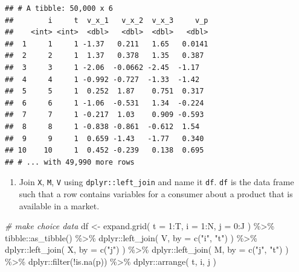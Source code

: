 \documentclass[
]{book}
\newenvironment{Shaded}{\begin{snugshade}}{\end{snugshade}}
\newcommand{\AttributeTok}[1]{\textcolor[rgb]{0.77,0.63,0.00}{#1}}
\newcommand{\CommentTok}[1]{\textcolor[rgb]{0.56,0.35,0.01}{\textit{#1}}}
\newcommand{\DecValTok}[1]{\textcolor[rgb]{0.00,0.00,0.81}{#1}}
\newcommand{\FunctionTok}[1]{\textcolor[rgb]{0.00,0.00,0.00}{#1}}
\newcommand{\NormalTok}[1]{#1}
\newcommand{\OtherTok}[1]{\textcolor[rgb]{0.56,0.35,0.01}{#1}}
\newcommand{\SpecialCharTok}[1]{\textcolor[rgb]{0.00,0.00,0.00}{#1}}
\newcommand{\StringTok}[1]{\textcolor[rgb]{0.31,0.60,0.02}{#1}}
\providecommand{\tightlist}{%
  \setlength{\itemsep}{0pt}\setlength{\parskip}{0pt}}
\begin{document}
\begin{verbatim}
## # A tibble: 50,000 x 6
##        i     t  v_x_1   v_x_2  v_x_3     v_p
##    <int> <int>  <dbl>   <dbl>  <dbl>   <dbl>
##  1     1     1 -1.37   0.211   1.65   0.0141
##  2     2     1  1.37   0.378   1.35   0.387 
##  3     3     1 -2.06  -0.0662 -2.45  -1.17  
##  4     4     1 -0.992 -0.727  -1.33  -1.42  
##  5     5     1  0.252  1.87    0.751  0.317 
##  6     6     1 -1.06  -0.531   1.34  -0.224 
##  7     7     1 -0.217  1.03    0.909 -0.593 
##  8     8     1 -0.838 -0.861  -0.612  1.54  
##  9     9     1  0.659 -1.43   -1.77   0.340 
## 10    10     1  0.452 -0.239   0.138  0.695 
## # ... with 49,990 more rows
\end{verbatim}

\begin{enumerate}
\def\labelenumi{\arabic{enumi}.}
\setcounter{enumi}{4}
\tightlist
\item
  Join \texttt{X}, \texttt{M}, \texttt{V} using \texttt{dplyr::left\_join} and name it \texttt{df}. \texttt{df} is the data frame such that a row contains variables for a consumer about a product that is available in a market.
\end{enumerate}

\begin{Shaded}
\begin{Highlighting}[]
\CommentTok{\# make choice data}
\NormalTok{df }\OtherTok{\textless{}{-}} 
  \FunctionTok{expand.grid}\NormalTok{(}
    \AttributeTok{t =} \DecValTok{1}\SpecialCharTok{:}\NormalTok{T, }
    \AttributeTok{i =} \DecValTok{1}\SpecialCharTok{:}\NormalTok{N, }
    \AttributeTok{j =} \DecValTok{0}\SpecialCharTok{:}\NormalTok{J}
\NormalTok{    ) }\SpecialCharTok{\%\textgreater{}\%}
\NormalTok{    tibble}\SpecialCharTok{::}\FunctionTok{as\_tibble}\NormalTok{() }\SpecialCharTok{\%\textgreater{}\%}
\NormalTok{    dplyr}\SpecialCharTok{::}\FunctionTok{left\_join}\NormalTok{(}
\NormalTok{      V, }
      \AttributeTok{by =} \FunctionTok{c}\NormalTok{(}\StringTok{"i"}\NormalTok{, }\StringTok{"t"}\NormalTok{)}
\NormalTok{      ) }\SpecialCharTok{\%\textgreater{}\%}
\NormalTok{    dplyr}\SpecialCharTok{::}\FunctionTok{left\_join}\NormalTok{(}
\NormalTok{      X, }
      \AttributeTok{by =} \FunctionTok{c}\NormalTok{(}\StringTok{"j"}\NormalTok{)}
\NormalTok{      ) }\SpecialCharTok{\%\textgreater{}\%}
\NormalTok{    dplyr}\SpecialCharTok{::}\FunctionTok{left\_join}\NormalTok{(}
\NormalTok{      M, }
      \AttributeTok{by =} \FunctionTok{c}\NormalTok{(}\StringTok{"j"}\NormalTok{, }\StringTok{"t"}\NormalTok{)}
\NormalTok{      ) }\SpecialCharTok{\%\textgreater{}\%}
\NormalTok{    dplyr}\SpecialCharTok{::}\FunctionTok{filter}\NormalTok{(}\SpecialCharTok{!}\FunctionTok{is.na}\NormalTok{(p)) }\SpecialCharTok{\%\textgreater{}\%}
\NormalTok{    dplyr}\SpecialCharTok{::}\FunctionTok{arrange}\NormalTok{(}
\NormalTok{      t, }
\NormalTok{      i, }
\NormalTok{      j}
\NormalTok{      )}
\end{Highlighting}
\end{Shaded}
\end{document}
